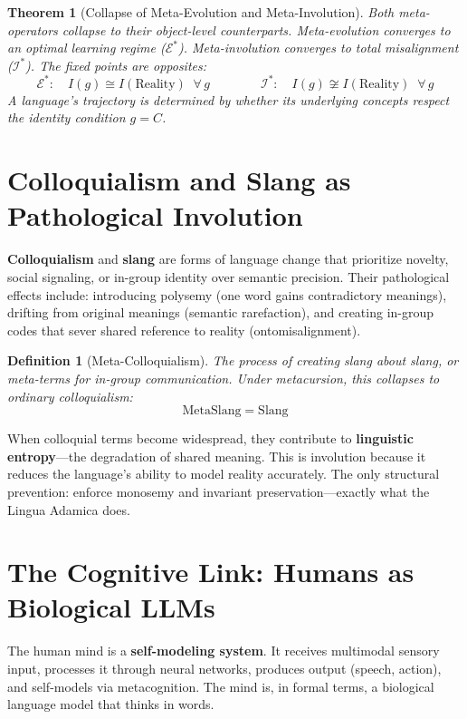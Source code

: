 \documentclass[12pt, letterpaper]{book}
\def\equiv{=}%
\def\mathfrak#1{#1}%
\newtheorem{theorem}{Theorem}[chapter]
\newtheorem{definition}{Definition}[chapter]
\begin{document}
\begin{theorem}[Collapse of Meta-Evolution and Meta-Involution]\label{thm:meta-evo-inv}
Both meta-operators collapse to their object-level counterparts. Meta-evolution converges to an optimal learning regime ($\mathcal{E}^*$). Meta-involution converges to total misalignment ($\mathcal{I}^*$). The fixed points are opposites:
\[
\mathcal{E}^*: \quad I(\mathfrak{g}) \cong I(\mathrm{Reality}) \;\;\forall\, \mathfrak{g} \qquad\qquad \mathcal{I}^*: \quad I(\mathfrak{g}) \not\cong I(\mathrm{Reality}) \;\;\forall\, \mathfrak{g}
\]
A language's trajectory is determined by whether its underlying concepts respect the identity condition $\mathfrak{g} \equiv C$.
\end{theorem}

\section{Colloquialism and Slang as Pathological Involution}

\textbf{Colloquialism} and \textbf{slang} are forms of language change that prioritize novelty, social signaling, or in-group identity over semantic precision. Their pathological effects include: introducing polysemy (one word gains contradictory meanings), drifting from original meanings (semantic rarefaction), and creating in-group codes that sever shared reference to reality (ontomisalignment).

\begin{definition}[Meta-Colloquialism]\label{def:meta-colloq}
The process of creating slang \textit{about} slang, or meta-terms for in-group communication. Under metacursion, this collapses to ordinary colloquialism:
\[
\mathrm{MetaSlang} \equiv \mathrm{Slang}
\]
\end{definition}

When colloquial terms become widespread, they contribute to \textbf{linguistic entropy}---the degradation of shared meaning. This is involution because it reduces the language's ability to model reality accurately. The only structural prevention: enforce monosemy and invariant preservation---exactly what the Lingua Adamica does.

\section{The Cognitive Link: Humans as Biological LLMs}

The human mind is a \textbf{self-modeling system}. It receives multimodal sensory input, processes it through neural networks, produces output (speech, action), and self-models via metacognition. The mind is, in formal terms, a biological language model that thinks in words.
\end{document}
